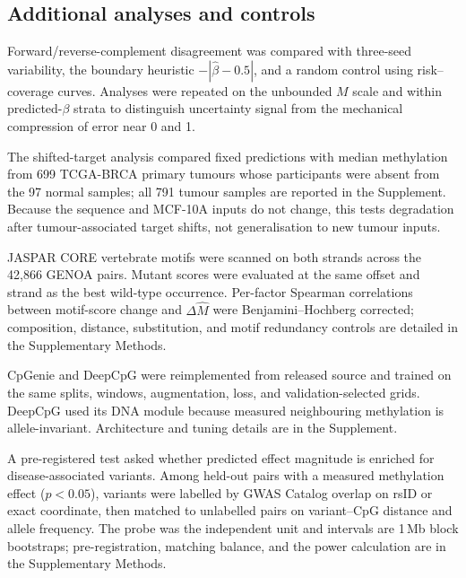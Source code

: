\documentclass[10pt,letterpaper,twocolumn]{article}
\begin{document}
\subsection{Additional analyses and controls}
\label{sec:uncertainty-methods}
{\color{addedred}

Forward/reverse-complement disagreement was compared with three-seed variability,
the boundary heuristic $-|\widehat\beta-0.5|$, and a random control using
risk--coverage curves. Analyses were repeated on the unbounded $M$ scale and
within predicted-$\beta$ strata to distinguish uncertainty signal from the
mechanical compression of error near 0 and 1.

\label{sec:tumor-methods}

The shifted-target analysis compared fixed predictions with median methylation
from 699 TCGA-BRCA primary tumours whose participants were absent from the 97
normal samples; all 791 tumour samples are reported in the Supplement. Because
the sequence and MCF-10A inputs do not change, this tests degradation after
tumour-associated target shifts, not generalisation to new tumour inputs.

\label{sec:motif-methods}

JASPAR CORE vertebrate motifs \cite{castrocolin2013jaspar} were scanned on both
strands across the 42{,}866 GENOA pairs. Mutant scores were evaluated at the same
offset and strand as the best wild-type occurrence. Per-factor Spearman
correlations between motif-score change and $\Delta\widehat M$ were
Benjamini--Hochberg corrected; composition, distance, substitution, and motif
redundancy controls are detailed in the Supplementary Methods.

\label{sec:published-methods}

CpGenie \cite{zeng2017cpgenie} and DeepCpG
\cite{angermueller2017deepcpg} were reimplemented from released source and
trained on the same splits, windows, augmentation, loss, and validation-selected
grids. DeepCpG used its DNA module because measured neighbouring methylation is
allele-invariant. Architecture and tuning details are in the Supplement.

\label{sec:matched-methods}

A pre-registered test asked whether predicted effect magnitude is enriched for
disease-associated variants. Among held-out pairs with a measured methylation
effect ($p<0.05$), variants were labelled by GWAS Catalog overlap on rsID or
exact coordinate, then matched to unlabelled pairs on variant--CpG distance and
allele frequency. The probe was the independent unit and intervals are 1\,Mb
block bootstraps; pre-registration, matching balance, and the power calculation
are in the Supplementary Methods.

}
\end{document}
